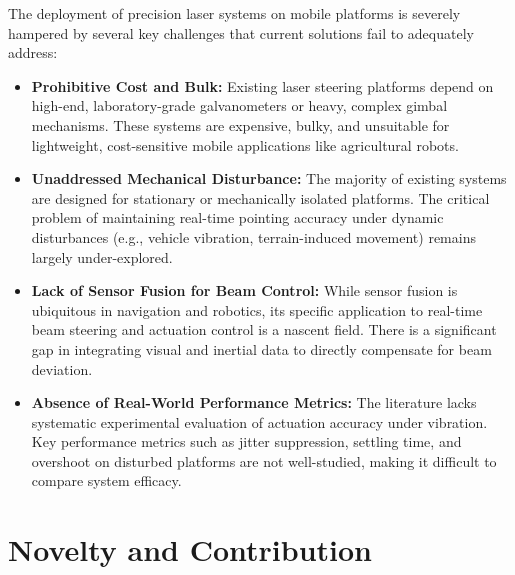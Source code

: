 \documentclass[12pt]{article}
\begin{document}
The deployment of precision laser systems on mobile platforms is severely hampered by several key challenges that current solutions fail to adequately address:
\begin{itemize}
    \item \textbf{Prohibitive Cost and Bulk:} Existing laser steering platforms depend on high-end, laboratory-grade galvanometers or heavy, complex gimbal mechanisms. These systems are expensive, bulky, and unsuitable for lightweight, cost-sensitive mobile applications like agricultural robots.
    \item \textbf{Unaddressed Mechanical Disturbance:} The majority of existing systems are designed for stationary or mechanically isolated platforms. The critical problem of maintaining real-time pointing accuracy under dynamic disturbances (e.g., vehicle vibration, terrain-induced movement) remains largely under-explored.
    \item \textbf{Lack of Sensor Fusion for Beam Control:} While sensor fusion is ubiquitous in navigation and robotics, its specific application to real-time beam steering and actuation control is a nascent field. There is a significant gap in integrating visual and inertial data to directly compensate for beam deviation.
    \item \textbf{Absence of Real-World Performance Metrics:} The literature lacks systematic experimental evaluation of actuation accuracy under vibration. Key performance metrics such as jitter suppression, settling time, and overshoot on disturbed platforms are not well-studied, making it difficult to compare system efficacy.
\end{itemize}

\vspace{1cm}

\section*{Novelty and Contribution}
\end{document}
